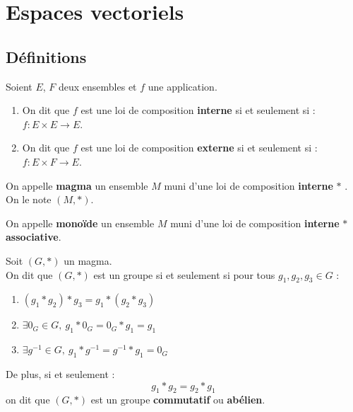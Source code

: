 \chapter{Espaces vectoriels}\label{chap:espaces_vectoriels}
\def\arraystretch{1}

\section{Définitions}
\begin{definition}
	Soient $E$, $F$ deux ensembles et $f$ une application.
	\begin{enumerate}
		\item On dit que $f$ est une loi de composition \textbf{interne} si et seulement si : $f : E \times E \to E$.
		\item On dit que $f$ est une loi de composition \textbf{externe} si et seulement si : $f : E \times F \to E$.
	\end{enumerate}
\end{definition}

\begin{definition}[Magma]
	On appelle \textbf{magma} un ensemble $M$ muni d'une loi de composition \textbf{interne} \og $*$ \fg. 
	\\
	On le note $(M, *)$.
\end{definition}

\begin{definition}
	On appelle \textbf{monoïde} un ensemble $M$ muni d'une loi de composition \textbf{interne} \og $*$ \fg \textbf{associative}.
\end{definition}

\begin{definition}[Groupe]
	Soit $(G, *)$ un magma.
	\\ 
	On dit que $(G, *)$ est un groupe si et seulement si pour tous $g_1, g_2, g_3 \in G$ : 
    \begin{enumerate}
    		\item $(g_1 * g_2) * g_3 = g_1 * (g_2 * g_3)$
    		\item $\exists 0_G \in G,\ g_1 * 0_G = 0_G * g_1 = g_1$
    		\item $\exists g^{-1} \in G,\ g_1 * g^{-1} = g^{-1} * g_1 = 0_G$
    	\end{enumerate}
    \noindent De plus, si et seulement :
    \[ g_1 * g_2 = g_2* g_1 \]
    on dit que $(G, *)$ est un groupe \textbf{commutatif} ou \textbf{abélien}.
\end{definition}

